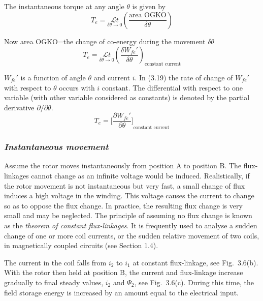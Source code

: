 \documentclass[a4paper,numbers=noenddot,12pt]{scrbook}
\begin{document}
            The instantaneous torque at any angle $\theta$ is given by
            \begin{equation}
                T_e = \underset{\delta \theta \to 0}{\mathcal{L} t} \left(\dfrac{\text{area OGKO}}{\delta \theta}\right)
                \label{eq:Eq3.18}
            \end{equation}

            Now area OGKO=the change of co-energy during the movement $\delta \theta$
            \begin{equation}
                T_e = \underset{\delta \theta \to 0}{\mathcal{L} t} {\left(\dfrac{\delta W_{fe}'}{\delta \theta}\right)}_{\text{constant current}}
                \label{eq:Eq3.19}
            \end{equation}

            $W_{fe}'$ is a function of angle $\theta$ and current $i$. In (3.19) the rate of change of $W_{fe}'$ with respect to $\theta$ occurs with $i$ constant. The differential with respect to one variable (with other variable considered as constants) is denoted by the partial derivative $\partial / \partial \theta$.
            \begin{equation}
                T_e = {\Big[ \dfrac{\partial W_{fe}'}{\partial \theta}\Big]}_{\text{constant current}}
                \label{eq:Eq3.20}
            \end{equation}

            \subsubsection{\textit{Instantaneous movement}}
            Assume the rotor moves instantaneously from position A to position B. The flux-linkages cannot change as an infinite voltage would be induced. Realistically, if the rotor movement is not instantaneous but very fast, a small change of flux induces a high voltage in the winding. This voltage causes the current to change so as to oppose the flux change. In practice, the resulting flux change is very small and may be neglected. The principle of
            assuming no flux change is known as the \textit{theorem of constant flux-linkages}. It is frequently used to analyse a sudden change of one or more coil currents, or the sudden relative movement of two coils, in magnetically coupled circuits (see Section 1.4). 

            The current in the coil falls from $i_2$ to $i_1$ at constant flux-linkage, see Fig.\ 3.6(b). With the rotor then held at position B, the current and flux-linkage increase gradually to final steady values, $i_2$ and $\varPsi_2$, see Fig.\ 3.6(c). During this time, the field storage energy is increased by an amount equal to the electrical input.
\end{document}

